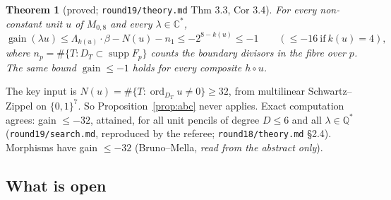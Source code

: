 \documentclass[11pt]{article}
\newtheorem{theorem}{Theorem}[section]
\newcommand{\C}{\mathbb C}
\newcommand{\Q}{\mathbb Q}
\newcommand{\ord}{\operatorname{ord}}
\newcommand{\gain}{\operatorname{gain}}
\newcommand{\rec}[1]{\texttt{#1}}
\begin{document}
\begin{theorem}[proved; \rec{round19/theory.md} Thm 3.3, Cor 3.4]\label{thm:units}
For every non-constant unit \(u\) of \(M_{0,8}\) and every
\(\lambda\in\C^*\),
\[
  \gain(\lambda u)\le\Lambda_{k(u)}\cdot\beta-N(u)-n_1\le-2^{8-k(u)}\le-1
  \qquad(\le-16\ \text{if}\ k(u)=4),
\]
where \(n_p=\#\{T:D_T\subset\operatorname{supp}F_p\}\) counts the boundary
divisors in the fibre over \(p\).  The same bound \(\gain\le-1\) holds for
every composite \(h\circ u\).
\end{theorem}

The key input is \(N(u)=\#\{T:\ord_{D_T}u\ne0\}\ge32\), from multilinear
Schwartz--Zippel on \(\{0,1\}^7\).  So Proposition~\ref{prop:abc} never
applies.  Exact computation agrees: gain \(\le-32\), attained, for all unit
pencils of degree \(D\le6\) and all \(\lambda\in\Q^*\) (\rec{round19/search.md},
reproduced by the referee; \rec{round18/theory.md} \S2.4).  Morphisms have
gain \(\le-32\) (Bruno--Mella, \emph{read from the abstract only}).

\subsection{What is open}
\end{document}
